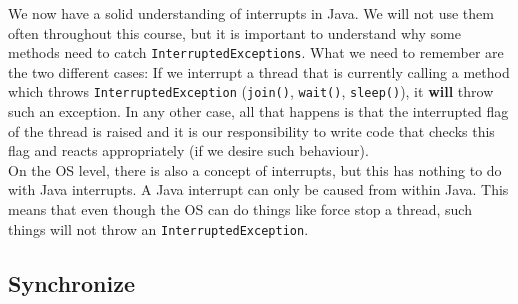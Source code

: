 \documentclass[main.tex]{subfiles}
\begin{document}
We now have a solid understanding of interrupts in Java. We will not use them often throughout this course, but it is important to understand why some methods need to catch \texttt{InterruptedExceptions}. What we need to remember are the two different cases: If we interrupt a thread that is currently calling a method which throws \texttt{InterruptedException} (\texttt{join()}, \texttt{wait()}, \texttt{sleep()}), it \textbf{will} throw such an exception. In any other case, all that happens is that the interrupted flag of the thread is raised and it is our responsibility to write code that checks this flag and reacts appropriately (if we desire such behaviour).\\[3mm]
On the OS level, there is also a concept of interrupts, but this has nothing to do with Java interrupts. A Java interrupt can only be caused from within Java. This means that even though the OS can do things like force stop a thread, such things will not throw an \texttt{InterruptedException}.

\subsection{Synchronize}
\end{document}
